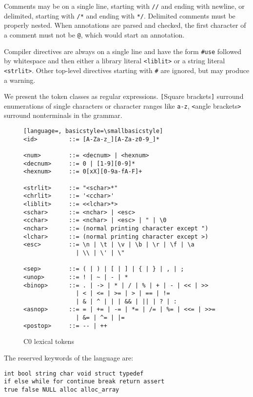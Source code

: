 \documentclass[11pt]{article}
\begin{document}
Comments may be on a single line, starting with \lstinline'//'
and ending with newline, or delimited, starting with
\lstinline'/*' and ending with \lstinline'*/'.  Delimited comments
must be properly nested.  When annotations are parsed and
checked, the first character of a comment must not be
\lstinline'@', which would start an annotation.

Compiler directives are always on a single line and have the form
\lstinline'#use' followed by whitespace and then either a library literal
\lstinline'<liblit>' or a string literal \lstinline'<strlit>'.  Other
top-level directives starting with \lstinline'#' are ignored, but
may produce a warning.

We present the token classes as regular expressions.  \lstinline'['Square
brackets\lstinline']' surround enumerations of single characters or
character ranges like \lstinline'a-z', \lstinline'<'angle brackets\lstinline'>'
surround nonterminals in the grammar.

\begin{figure}
\begin{lstlisting}[language=, basicstyle=\smallbasicstyle]
<id>         ::= [A-Za-z_][A-Za-z0-9_]*

<num>        ::= <decnum> | <hexnum>
<decnum>     ::= 0 | [1-9][0-9]*
<hexnum>     ::= 0[xX][0-9a-fA-F]+

<strlit>     ::= "<schar>*"
<chrlit>     ::= '<cchar>'
<liblit>     ::= <<lchar>*>
<schar>      ::= <nchar> | <esc>
<cchar>      ::= <nchar> | <esc> | " | \0
<nchar>      ::= (normal printing character except ")
<lchar>      ::= (normal printing character except >)
<esc>        ::= \n | \t | \v | \b | \r | \f | \a
               | \\ | \' | \"

<sep>        ::= ( | ) | [ | ] | { | } | , | ;
<unop>       ::= ! | ~ | - | *
<binop>      ::= . | -> | * | / | % | + | - | << | >>
               | < | <= | >= | > | == | !=
               | & | ^ | | | && | || | ? | :
<asnop>      ::= = | += | -= | *= | /= | %= | <<= | >>=
               | &= | ^= | |=
<postop>     ::= -- | ++
\end{lstlisting}
\caption{C0 lexical tokens}
\label{fig:tokens}
\end{figure}

The reserved keywords of the language are:
\begin{lstlisting}
int bool string char void struct typedef
if else while for continue break return assert
true false NULL alloc alloc_array
\end{lstlisting}
\end{document}
